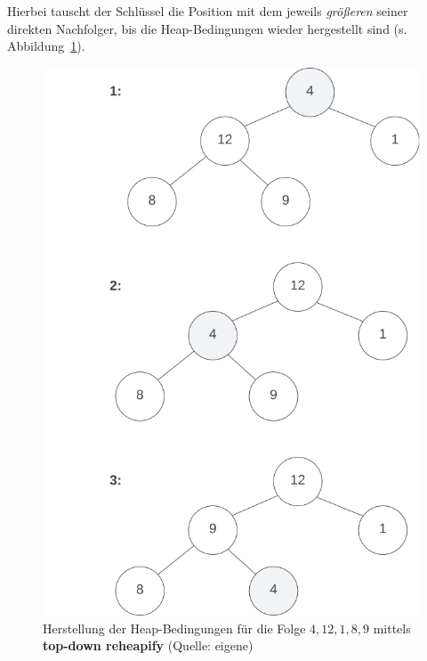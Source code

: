 \noindent
Hierbei tauscht der Schlüssel die Position mit dem jeweils \textit{größeren} seiner direkten Nachfolger, bis die Heap-Bedingungen wieder hergestellt sind (s. Abbildung~\ref{fig:sink}).\\


\begin{figure}
    \begin{center}
        \includegraphics[scale=0.35]{chapters/Datenstrukturen und Algorithmen/img/sink}
        \caption{Herstellung der Heap-Bedingungen für die Folge $4, 12, 1, 8, 9$ mittels \textbf{top-down reheapify} (Quelle: eigene)}
        \label{fig:sink}
    \end{center}
\end{figure}


